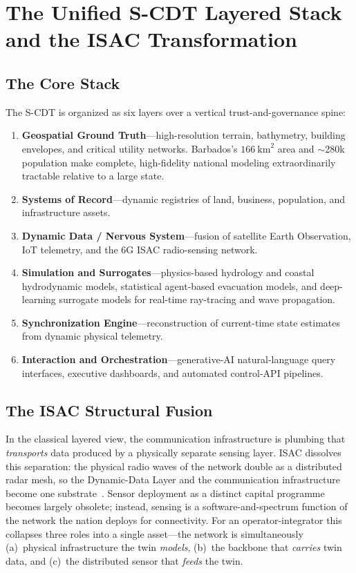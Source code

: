 \documentclass[10pt,twocolumn]{article}
\begin{document}
\section{The Unified S-CDT Layered Stack and the ISAC Transformation}
\label{sec:stack}

\subsection{The Core Stack}
The S-CDT is organized as six layers over a vertical trust-and-governance spine:

\begin{enumerate}
\item \textbf{Geospatial Ground Truth}---high-resolution terrain, bathymetry,
building envelopes, and critical utility networks. Barbados's
$166~\mathrm{km}^2$ area and $\sim$280k population make complete, high-fidelity
national modeling extraordinarily tractable relative to a large state.
\item \textbf{Systems of Record}---dynamic registries of land, business,
population, and infrastructure assets.
\item \textbf{Dynamic Data / Nervous System}---fusion of satellite Earth
Observation, IoT telemetry, and the 6G ISAC radio-sensing network.
\item \textbf{Simulation and Surrogates}---physics-based hydrology and coastal
hydrodynamic models, statistical agent-based evacuation models, and deep-learning
surrogate models for real-time ray-tracing and wave propagation.
\item \textbf{Synchronization Engine}---reconstruction of current-time state
estimates from dynamic physical telemetry.
\item \textbf{Interaction and Orchestration}---generative-AI natural-language
query interfaces, executive dashboards, and automated control-API pipelines.
\end{enumerate}

\subsection{The ISAC Structural Fusion}
In the classical layered view, the communication infrastructure is plumbing that
\emph{transports} data produced by a physically separate sensing layer. ISAC
dissolves this separation: the physical radio waves of the network double as a
distributed radar mesh, so the Dynamic-Data Layer and the communication
infrastructure become one substrate~\cite{ericsson_isc001,etsi_isc001}. Sensor
deployment as a distinct capital programme becomes largely obsolete; instead,
sensing is a software-and-spectrum function of the network the nation deploys
for connectivity. For an operator-integrator this collapses three roles into a
single asset---the network is simultaneously (a)~physical infrastructure the twin
\emph{models}, (b)~the backbone that \emph{carries} twin data, and (c)~the
distributed sensor that \emph{feeds} the twin.
\end{document}
